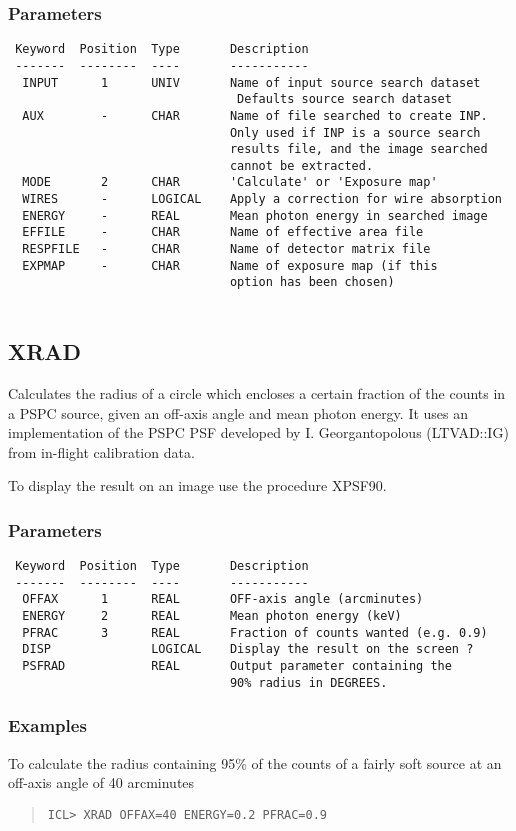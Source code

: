 \documentclass{book}
\renewcommand{\_}{{\tt\char'137}}     %
\begin{document}
\subsubsection{Parameters}
\begin{verbatim}
 Keyword  Position  Type       Description
 -------  --------  ----       -----------
  INPUT      1      UNIV       Name of input source search dataset
                                Defaults source search dataset
  AUX        -      CHAR       Name of file searched to create INP.
                               Only used if INP is a source search
                               results file, and the image searched
                               cannot be extracted.
  MODE       2      CHAR       'Calculate' or 'Exposure map'
  WIRES      -      LOGICAL    Apply a correction for wire absorption
  ENERGY     -      REAL       Mean photon energy in searched image
  EFFILE     -      CHAR       Name of effective area file
  RESPFILE   -      CHAR       Name of detector matrix file
  EXPMAP     -      CHAR       Name of exposure map (if this
                               option has been chosen)
 
\end{verbatim}\subsection{XRAD}
Calculates the radius of a circle which encloses a certain fraction
of the counts in a PSPC source, given an off-axis angle and mean
photon energy. It uses an implementation of the PSPC PSF developed
by I. Georgantopolous (LTVAD::IG) from in-flight calibration data.
 
To display the result on an image use the procedure XPSF90.
 
\subsubsection{Parameters}
\begin{verbatim}
 Keyword  Position  Type       Description
 -------  --------  ----       -----------
  OFFAX      1      REAL       OFF-axis angle (arcminutes)
  ENERGY     2      REAL       Mean photon energy (keV)
  PFRAC      3      REAL       Fraction of counts wanted (e.g. 0.9)
  DISP              LOGICAL    Display the result on the screen ?
  PSFRAD            REAL       Output parameter containing the
                               90% radius in DEGREES.
\end{verbatim}\subsubsection{Examples}
To calculate the radius containing 95\% of the counts of a fairly soft
source at an off-axis angle of 40 arcminutes
\begin{quote}\begin{verbatim}
ICL> XRAD OFFAX=40 ENERGY=0.2 PFRAC=0.9
\end{verbatim}\end{quote}
\end{document}
